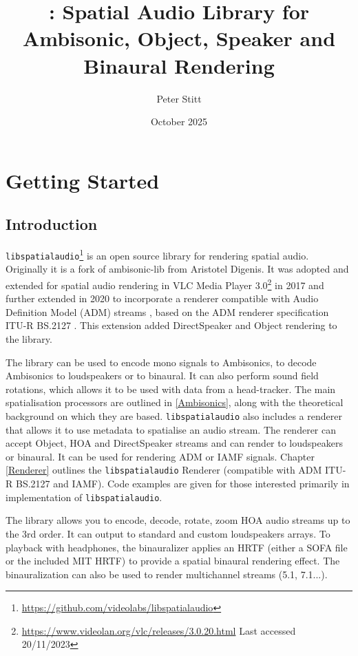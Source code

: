 \documentclass[12pt]{report}
\title{\libspataud: Spatial Audio Library for Ambisonic, Object, Speaker and Binaural Rendering}
\author{Peter Stitt}
\date{October 2025}
\def\libspataud{\texttt{libspatialaudio}\xspace}
\begin{document}
\maketitle

\tableofcontents

\chapter{Getting Started}\label{GettingStarted}

\section{Introduction}
\libspataud\footnote{\href{https://github.com/videolabs/libspatialaudio}{https://github.com/videolabs/libspatialaudio}} is an open source library for rendering spatial audio.
Originally it is a fork of ambisonic-lib from Aristotel Digenis.
It was adopted and extended for spatial audio rendering in VLC Media Player 3.0\footnote{\href{https://www.videolan.org/vlc/releases/3.0.20.html}{https://www.videolan.org/vlc/releases/3.0.20.html} Last accessed 20/11/2023} in 2017 and further extended in 2020 to incorporate a renderer compatible with Audio Definition Model (ADM) streams \cite{ITU2076}, based on the ADM renderer specification ITU-R BS.2127 \cite{ITU2127}. This extension added DirectSpeaker and Object rendering to the library.

The library can be used to encode mono signals to Ambisonics, to decode Ambisonics to loudspeakers or to binaural.
It can also perform sound field rotations, which allows it to be used with data from a head-tracker.
The main spatialisation processors are outlined in \cref{Ambisonics}, along with the theoretical background on which they are based.
\libspataud also includes a renderer that allows it to use metadata to spatialise an audio stream.
The renderer can accept Object, HOA and DirectSpeaker streams and can render to loudspeakers or binaural.
It can be used for rendering ADM or IAMF signals.
Chapter \ref{Renderer} outlines the \libspataud Renderer (compatible with ADM ITU-R BS.2127 and IAMF).
Code examples are given for those interested primarily in implementation of \libspataud.

The library allows you to encode, decode, rotate, zoom HOA audio streams up to the 3rd order. It can output to standard and custom loudspeakers arrays. To playback with headphones, the binauralizer applies an HRTF (either a SOFA file or  the included MIT HRTF) to provide a spatial binaural rendering effect. The binauralization can also be used to render multichannel streams (5.1, 7.1...).
\end{document}
